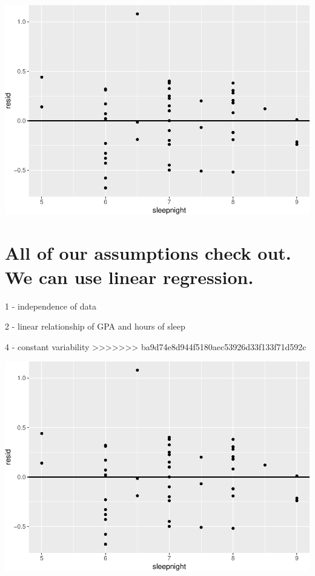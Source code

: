 \documentclass[]{article}
\newenvironment{Shaded}{\begin{snugshade}}{\end{snugshade}}
\newcommand{\DataTypeTok}[1]{\textcolor[rgb]{0.13,0.29,0.53}{#1}}
\newcommand{\DecValTok}[1]{\textcolor[rgb]{0.00,0.00,0.81}{#1}}
\newcommand{\KeywordTok}[1]{\textcolor[rgb]{0.13,0.29,0.53}{\textbf{#1}}}
\newcommand{\NormalTok}[1]{#1}
\newcommand{\OperatorTok}[1]{\textcolor[rgb]{0.81,0.36,0.00}{\textbf{#1}}}
\newcommand{\StringTok}[1]{\textcolor[rgb]{0.31,0.60,0.02}{#1}}
\begin{document}
\includegraphics{lab-8-regression_files/figure-latex/unnamed-chunk-10-1.pdf}

\hypertarget{all-of-our-assumptions-check-out.-we-can-use-linear-regression.}{%
\section{All of our assumptions check out. We can use linear
regression.}\label{all-of-our-assumptions-check-out.-we-can-use-linear-regression.}}

1 - independence of data

2 - linear relationship of GPA and hours of sleep

4 - constant variability
\textgreater{}\textgreater{}\textgreater{}\textgreater{}\textgreater{}\textgreater{}\textgreater{}
ba9d74e8d944f5180aec53926d33f133f71d592c

\begin{Shaded}
\end{Shaded}

\includegraphics{lab-8-regression_files/figure-latex/unnamed-chunk-11-1.pdf}
\end{document}
